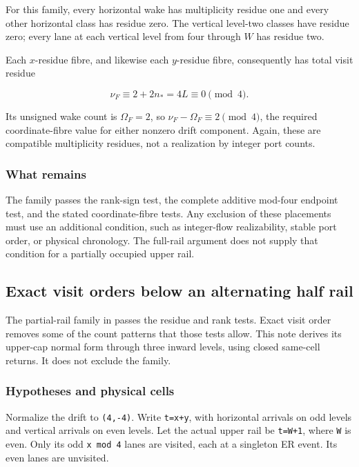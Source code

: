 \documentclass[11pt,letterpaper]{article}
\theoremstyle{plain}
\theoremstyle{definition}
\begin{document}
\begin{NoHyper}
For this family, every horizontal wake has multiplicity residue one and every other horizontal class has residue zero. The vertical level-two classes have residue zero; every lane at each vertical level from four through \(W\) has residue two.

Each \(x\)-residue fibre, and likewise each \(y\)-residue fibre, consequently has total visit residue

\[
\nu_F\equiv2+2n_*=4L\equiv0\pmod4.
\]

Its unsigned wake count is \(\Omega_F=2\), so \(\nu_F-\Omega_F\equiv2\pmod4\), the required coordinate-fibre value for either nonzero drift component. Again, these are compatible multiplicity residues, not a realization by integer port counts.

\subsubsection{What remains}

The family passes the rank-sign test, the complete additive mod-four endpoint test, and the stated coordinate-fibre tests. Any exclusion of these placements must use an additional condition, such as integer-flow realizability, stable port order, or physical chronology. The full-rail argument does not supply that condition for a partially occupied upper rail.


\subsection{Exact visit orders below an alternating half rail}

The partial-rail family in  passes the residue and rank tests. Exact visit order removes some of the count patterns that those tests allow. This note derives its upper-cap normal form through three inward levels, using closed same-cell returns. It does not exclude the family.

\subsubsection{Hypotheses and physical cells}

Normalize the drift to \texttt{(4,-4)}. Write \texttt{t=x+y}, with horizontal arrivals on odd levels and vertical arrivals on even levels. Let the actual upper rail be \texttt{t=W+1}, where \texttt{W} is even. Only its odd \texttt{x\ mod\ 4} lanes are visited, each at a singleton ER event. Its even lanes are unvisited.


\end{NoHyper}
\end{document}

